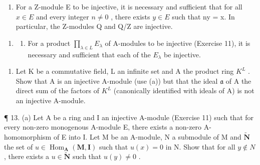 \begin{enumerate}
\def\labelenumi{(\alph{enumi})}
\setcounter{enumi}{1}
\tightlist
\item
  For a Z-module E to be injective, it is necessary and sufficient that for all \(x \in E\) and every integer \(n \neq 0\) , there exists \(y \in E\) such that ny = x. In particular, the Z-modules Q and Q/Z are injective.
\end{enumerate}

\begin{enumerate}
\def\labelenumi{\arabic{enumi}.}
\setcounter{enumi}{11}
\tightlist
\item
  \begin{enumerate}
  \def\labelenumii{(\alph{enumii})}
  \tightlist
  \item
    For a product \(\prod_{\lambda \in L} E_{\lambda}\) of A-modules to be injective (Exercise 11), it is necessary and sufficient that each of the \(E_{\lambda}\) be injective.
  \end{enumerate}
\end{enumerate}

\begin{enumerate}
\def\labelenumi{(\alph{enumi})}
\setcounter{enumi}{1}
\tightlist
\item
  Let K be a commutative field, L an infinite set and A the product ring \(K^{L}\) . Show that A is an injective A-module (use (a)) but that the ideal \(\mathfrak{a}\) of A the direct sum of the factors of \(K^{L}\) (canonically identified with ideals of A) is not an injective A-module.
\end{enumerate}

¶ 13. (a) Let A be a ring and I an injective A-module (Exercise 11) such that for every non-zero monogenous A-module E, there exists a non-zero A-homomorphism of E into I. Let M be an A-module, N a submodule of M and \(\tilde{\mathbf{N}}\) the set of \(u \in \operatorname{Hom}_{\mathbf{A}}(\mathbf{M}, \mathbf{I})\) such that \(u(x) = 0\) in N. Show that for all \(y \notin N\) , there exists a \(u \in \tilde{\mathbf{N}}\) such that \(u(y) \neq 0\) .

